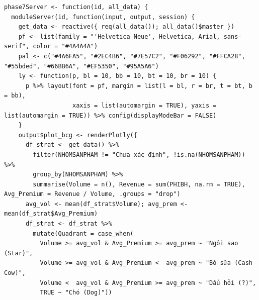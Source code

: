 \documentclass[12pt, a4paper]{article}
\begin{document}
\begin{lstlisting}
phase7Server <- function(id, all_data) {
  moduleServer(id, function(input, output, session) {
    get_data <- reactive({ req(all_data()); all_data()$master })
    pf <- list(family = "'Helvetica Neue', Helvetica, Arial, sans-serif", color = "#4A4A4A")
    pal <- c("#4A6FA5", "#2EC4B6", "#7E57C2", "#F06292", "#FFCA28", "#55bded", "#66BB6A", "#EF5350", "#95A5A6")
    ly <- function(p, bl = 10, bb = 10, bt = 10, br = 10) {
      p %>% layout(font = pf, margin = list(l = bl, r = br, t = bt, b = bb),
                   xaxis = list(automargin = TRUE), yaxis = list(automargin = TRUE)) %>% config(displayModeBar = FALSE)
    }
    output$plot_bcg <- renderPlotly({
      df_strat <- get_data() %>%
        filter(NHOMSANPHAM != "Chưa xác định", !is.na(NHOMSANPHAM)) %>%
        group_by(NHOMSANPHAM) %>%
        summarise(Volume = n(), Revenue = sum(PHIBH, na.rm = TRUE), Avg_Premium = Revenue / Volume, .groups = "drop")
      avg_vol <- mean(df_strat$Volume); avg_prem <- mean(df_strat$Avg_Premium)
      df_strat <- df_strat %>%
        mutate(Quadrant = case_when(
          Volume >= avg_vol & Avg_Premium >= avg_prem ~ "Ngôi sao (Star)",
          Volume >= avg_vol & Avg_Premium <  avg_prem ~ "Bò sữa (Cash Cow)",
          Volume <  avg_vol & Avg_Premium >= avg_prem ~ "Dấu hỏi (?)",
          TRUE ~ "Chó (Dog)"))


\end{lstlisting}
\end{document}
